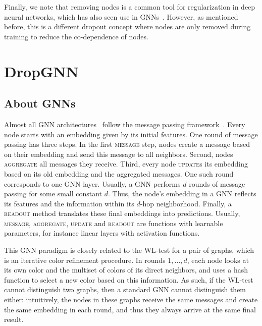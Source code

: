 \documentclass{article}
\begin{document}
Finally, we note that removing nodes is a common tool for regularization in deep neural networks, which has also seen use in GNNs~\citep{rong2019dropedge, Grand}. However, as mentioned before, this is a different dropout concept where nodes are only removed during training to reduce the co-dependence of nodes.

\section{DropGNN}

\subsection{About GNNs}
Almost all GNN architectures~\citep{velickovic2018graph, kipf2017semisupervised, GIN, defferrard2016convolutional, wu2020comprehensive, hamilton2017inductive, xu2018jumping} follow the message passing framework~\citep{gilmer2017neural, battaglia2018relational}. Every node starts with an embedding given by its initial features. One round of message passing has three steps. In the first \textsc{message} step, nodes create a message based on their embedding and send this message to all neighbors. Second, nodes \textsc{aggregate} all messages they receive. Third, every node \textsc{update}s its embedding based on its old embedding and the aggregated messages. One such round corresponds to one GNN layer. Usually, a GNN performs $d$ rounds of message passing for some small constant $d$. Thus, the node's embedding in a GNN reflects its features and the information within its $d$-hop neighborhood. Finally, a \textsc{readout} method translates these final embeddings into predictions. Usually, \textsc{message}, \textsc{aggregate}, \textsc{update} and \textsc{readout} are functions with learnable parameters, for instance linear layers with activation functions.

This GNN paradigm is closely related to the WL-test for a pair of graphs, which is an iterative color refinement procedure. In rounds $1, ..., d$, each node looks at its own color and the multiset of colors of its direct neighbors, and uses a hash function to select a new color based on this information. As such, if the WL-test cannot distinguish two graphs, then a standard GNN cannot distinguish them either: intuitively, the nodes in these graphs receive the same messages and create the same embedding in each round, and thus they always arrive at the same final result.
\end{document}

